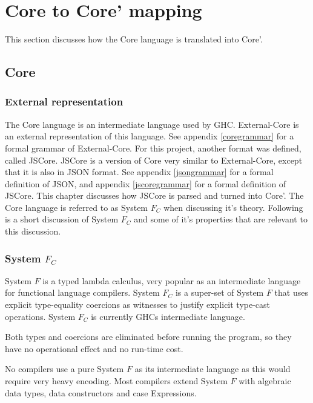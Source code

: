 
\section{Core to Core' mapping}
\label{chap:rewrite}

This section discusses how the Core language is translated into Core'.

\subsection{Core}

\subsubsection*{External representation}

The Core language is an intermediate language used by GHC. External-Core
is an external representation of this language. See appendix 
\ref{coregrammar} for a formal grammar of External-Core. For this project,
another format was defined, called JSCore. JSCore is a version of Core
very similar to External-Core, except that it is also in JSON format. 
See appendix \ref{jsongrammar} for a formal definition of JSON, and 
appendix \ref{jscoregrammar} for a formal definition of JSCore. This
chapter discusses how JSCore is parsed and turned into Core'. The Core
language is referred to as System $F_C$ when discussing it's theory.
Following is a short discussion of System $F_C$ and some of it's 
properties that are relevant to this discussion.

\subsubsection*{System $F_C$}

System $F$ is a typed lambda calculus, very popular as an intermediate language
for functional language compilers. System $F_C$ is a super-set of System $F$ 
that uses explicit type-equality coercions as witnesses to justify explicit
type-cast operations. System $F_C$ is currently GHCs intermediate language.
\cite{sulzmann2007system}

Both types and coercions are eliminated before running the program, so they have
no operational effect and no run-time cost.
\cite{sulzmann2007system}

No compilers use a pure System $F$ as its intermediate language as this would
require very heavy encoding. Most compilers extend System $F$ with algebraic
data types, data constructors and case Expressions.
\cite{sulzmann2007system}

